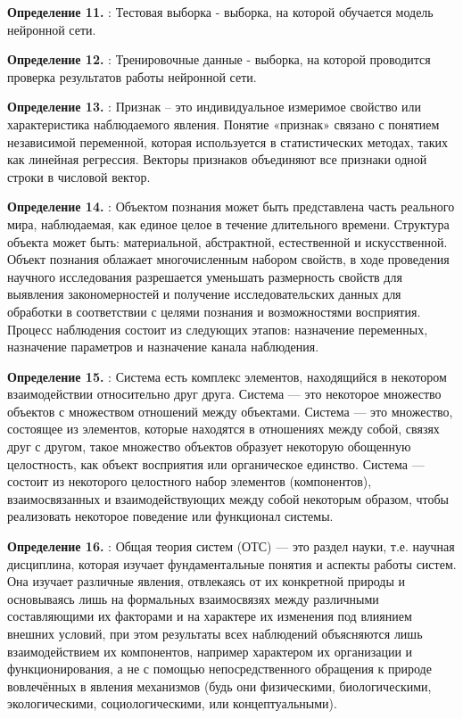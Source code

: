 \textbf{Определение 11.} :  Тестовая выборка - выборка, на которой обучается модель нейронной сети.

\textbf{Определение 12.} :  Тренировочные данные - выборка, на которой проводится проверка результатов работы нейронной сети.

\textbf{Определение 13.} :  Признак – это индивидуальное измеримое свойство или характеристика наблюдаемого явления. Понятие «признак» связано с понятием независимой переменной, которая используется в статистических методах, таких как линейная регрессия. Векторы признаков объединяют все признаки одной строки в числовой вектор.

\textbf{Определение 14.} :  Объектом познания может быть представлена часть реального мира, наблюдаемая, как единое целое в течение длительного времени. Структура объекта может быть: материальной, абстрактной, естественной и искусственной. Объект познания облажает многочисленным набором свойств, в ходе проведения научного исследования разрешается уменьшать размерность свойств для выявления закономерностей и получение исследовательских данных для обработки в соответствии с целями познания и возможностями восприятия. Процесс наблюдения состоит из следующих этапов: назначение переменных, назначение параметров и назначение канала наблюдения.

\textbf{Определение 15.} :  Система есть комплекс элементов, находящийся в некотором взаимодействии относительно друг друга. Система — это некоторое множество объектов с множеством отношений между объектами.
Система — это множество, состоящее из элементов, которые находятся в отношениях между собой, связях друг с другом, такое множество объектов образует некоторую обощенную целостность, как объект восприятия или органическое единство. Система — состоит из некоторого целостного набор элементов (компонентов), взаимосвязанных и взаимодействующих между собой некоторым образом, чтобы реализовать некоторое поведение или функционал системы.

\textbf{Определение 16.} : Общая теория систем (ОТС) — это раздел науки, т.е. научная дисциплина, которая изучает фундаментальные понятия и аспекты работы систем. Она изучает различные явления, отвлекаясь от их конкретной природы и основываясь лишь на формальных взаимосвязях между различными составляющими их факторами и на характере их изменения под влиянием внешних условий, при этом результаты всех наблюдений объясняются лишь взаимодействием их компонентов, например характером их организации и функционирования, а не с помощью непосредственного обращения к природе вовлечённых в явления механизмов (будь они физическими, биологическими, экологическими, социологическими, или концептуальными).
